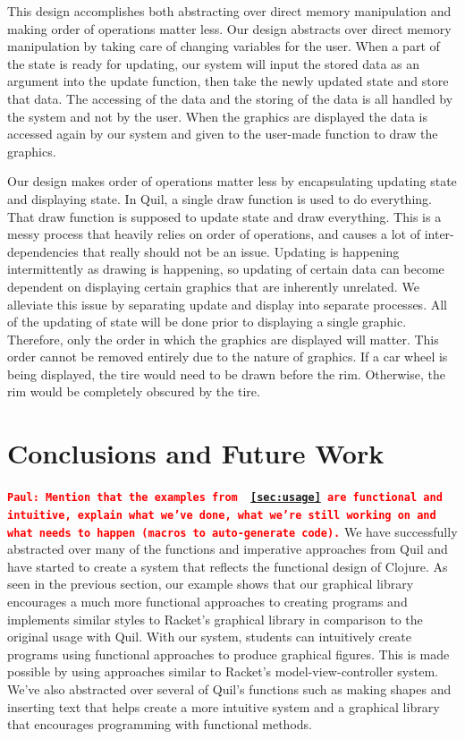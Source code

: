 \documentclass[12pt]{article}
\newcommand{\comment}[1]{{\bf \tt  {#1}}}
\newcommand{\emcomment}[1]{\textcolor{ForestGreen}{\comment{Elena: {#1}}}}
\newcommand{\pscomment}[1]{\textcolor{red}{\comment{Paul: {#1}}}}
\begin{document}
This design accomplishes both abstracting over direct memory manipulation and making order of operations matter less. Our design abstracts over direct memory manipulation by taking care of changing variables for the user. When a part of the state is ready for updating, our system will input the stored data as an argument into the update function, then take the newly updated state and store that data. The accessing of the data and the storing of the data is all handled by the system and not by the user. When the graphics are displayed the data is accessed again by our system and given to the user-made function to draw the graphics. 

Our design makes order of operations matter less by encapsulating updating state and displaying state. In Quil, a single draw function is used to do everything. That draw function is supposed to update state and draw everything. This is a messy process that heavily relies on order of operations, and causes a lot of inter-dependencies that really should not be an issue. Updating is happening intermittently as drawing is happening, so updating of certain data can become dependent on displaying certain graphics that are inherently unrelated. We alleviate this issue by separating update and display into separate processes. All of the updating of state will be done prior to displaying a single graphic. Therefore, only the order in which the graphics are displayed will matter. This order cannot be removed entirely due to the nature of graphics. If a car wheel is being displayed, the tire would need to be drawn before the rim. Otherwise, the rim would be completely obscured by the tire.

\section{Conclusions and Future Work}\label{sec:future-work}
\pscomment{Mention that the examples from ~\ref{sec:usage} are functional and intuitive, explain what we've done, what we're still working on and what needs to happen (macros to auto-generate code).}
We have successfully  abstracted over many of the functions and imperative approaches from Quil and have started to create a system that reflects the functional design of Clojure. As seen in the previous section, our example shows that our graphical library encourages a much more functional approaches to creating programs and implements similar styles to Racket's graphical library in comparison to the original usage with Quil. With our system, students can intuitively create programs using functional approaches to produce graphical figures. This is made possible by using approaches similar to Racket's model-view-controller system. We've also abstracted over several of Quil's functions such as making shapes and inserting text that helps create a more intuitive system and a graphical library that encourages programming with functional methods.%
\end{document}
